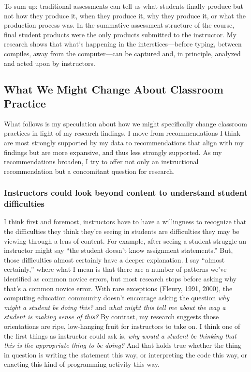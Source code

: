 To sum up: traditional assessments can tell us what students finally produce but not how they produce it, when they produce it, why they produce it, or what the production process was. In the summative assessment structure of the course, final student products were the only products submitted to the instructor. My research shows that what's happening in the interstices---before typing, between compiles, away from the computer---can be captured and, in principle, analyzed and acted upon by instructors.

\subsection{What We Might Change About Classroom Practice}\label{what-we-might-change-about-classroom-practice}

What follows is my speculation about how we might specifically change classroom practices in light of my research findings. I move from recommendations I think are most strongly supported by my data to recommendations that align with my findings but are more expansive, and thus less strongly supported. As my recommendations broaden, I try to offer not only an instructional recommendation but a concomitant question for research.

\subsubsection{Instructors could look beyond content to understand student difficulties}\label{instructors-could-look-beyond-content-to-understand-student-difficulties}

I think first and foremost, instructors have to have a willingness to recognize that the difficulties they think they're seeing in students are difficulties they may be viewing through a lens of content. For example, after seeing a student struggle an instructor might say ``the student doesn't know assignment statements.'' But, those difficulties almost certainly have a deeper explanation. I say ``almost certainly,'' where what I mean is that there are a number of patterns we've identified as common novice errors, but most research stops before asking why that's a common novice error. With rare exceptions (Fleury, 1991, 2000), the computing education community doesn't encourage asking the question \emph{why might a student be doing this?} and \emph{what might this tell me about the way a student is making sense of this?} By contrast, my research suggests those orientations are ripe, low-hanging fruit for instructors to take on. I think one of the first things as instructor could ask is, \emph{why would a student be thinking that this is the appropriate thing to be doing?} And that holds true whether the thing in question is writing the statement this way, or interpreting the code this way, or enacting this kind of programming activity this way.

